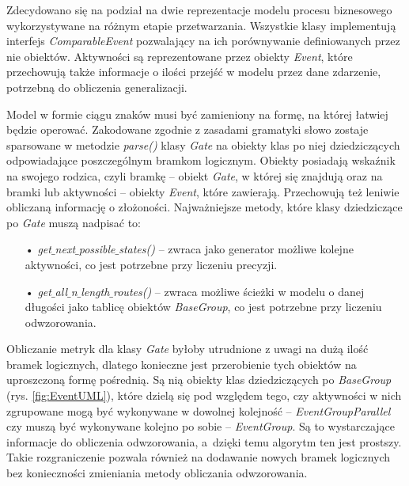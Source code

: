 Zdecydowano się na podział na dwie reprezentacje modelu procesu biznesowego wykorzystywane na różnym etapie przetwarzania. Wszystkie klasy implementują interfejs \textit{ComparableEvent} pozwalający na ich porównywanie definiowanych przez nie obiektów. Aktywności są reprezentowane przez obiekty \textit{Event}, które przechowują także informacje o ilości przejść w modelu przez dane zdarzenie, potrzebną do obliczenia generalizacji. 

Model w formie ciągu znaków musi być zamieniony na formę, na której łatwiej będzie operować. Zakodowane zgodnie z zasadami gramatyki słowo zostaje sparsowane w metodzie \textit{parse()} klasy \textit{Gate} na obiekty klas po niej dziedziczących odpowiadające poszczególnym bramkom logicznym. Obiekty posiadają wskaźnik na swojego rodzica, czyli bramkę -- obiekt \textit{Gate}, w której się znajdują oraz na bramki lub aktywności -- obiekty \textit{Event}, które zawierają. Przechowują też leniwie obliczaną informację o złożoności. Najważniejsze metody, które klasy dziedziczące po \textit{Gate} muszą nadpisać to:
\begin{itemize}
  \item[•] \textit{get$\_$next$\_$possible$\_$states()} -- zwraca jako generator możliwe kolejne aktywności, co jest potrzebne przy liczeniu precyzji.
  \item[•] \textit{get$\_$all$\_$n$\_$length$\_$routes()} -- zwraca możliwe ścieżki w modelu o danej długości jako tablicę obiektów \textit{BaseGroup}, co jest potrzebne przy liczeniu odwzorowania.
\end{itemize}

Obliczanie metryk dla klasy \textit{Gate} byłoby utrudnione z uwagi na dużą ilość bramek logicznych, dlatego konieczne jest przerobienie tych obiektów na uproszczoną formę pośrednią. Są nią obiekty klas dziedziczących po \textit{BaseGroup} (rys. \ref{fig:EventUML}), które dzielą się pod względem tego, czy aktywności w nich zgrupowane mogą być wykonywane w dowolnej kolejność -- \textit{EventGroupParallel} czy muszą być wykonywane kolejno po sobie -- \textit{EventGroup}. Są to wystarczające informacje do obliczenia odwzorowania, a~dzięki temu algorytm ten jest prostszy. Takie rozgraniczenie pozwala również na dodawanie nowych bramek logicznych bez konieczności zmieniania metody obliczania odwzorowania.

